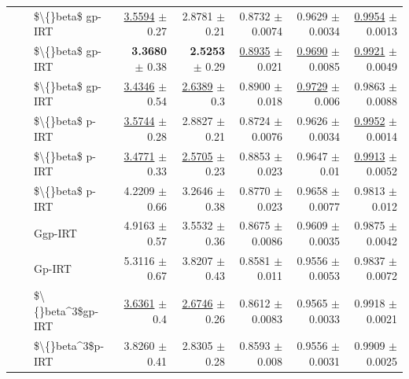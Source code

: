 \begin{longtable}{llp{}rrrrr}
 &  & \$\textbackslash\{\}beta\$ gp-IRT & \underline{3.5594} {\scriptsize $\pm$ 0.27} & 2.8781 {\scriptsize $\pm$ 0.21} & 0.8732 {\scriptsize $\pm$ 0.0074} & 0.9629 {\scriptsize $\pm$ 0.0034} & \underline{0.9954} {\scriptsize $\pm$ 0.0013} \\
 &  & \$\textbackslash\{\}beta\$ gp-IRT & \textbf{3.3680} {\scriptsize $\pm$ 0.38} & \textbf{2.5253} {\scriptsize $\pm$ 0.29} & \underline{0.8935} {\scriptsize $\pm$ 0.021} & \underline{0.9690} {\scriptsize $\pm$ 0.0085} & \underline{0.9921} {\scriptsize $\pm$ 0.0049} \\
 &  & \$\textbackslash\{\}beta\$ gp-IRT & \underline{3.4346} {\scriptsize $\pm$ 0.54} & \underline{2.6389} {\scriptsize $\pm$ 0.3} & 0.8900 {\scriptsize $\pm$ 0.018} & \underline{0.9729} {\scriptsize $\pm$ 0.006} & 0.9863 {\scriptsize $\pm$ 0.0088} \\
 &  & \$\textbackslash\{\}beta\$ p-IRT & \underline{3.5744} {\scriptsize $\pm$ 0.28} & 2.8827 {\scriptsize $\pm$ 0.21} & 0.8724 {\scriptsize $\pm$ 0.0076} & 0.9626 {\scriptsize $\pm$ 0.0034} & \underline{0.9952} {\scriptsize $\pm$ 0.0014} \\
 &  & \$\textbackslash\{\}beta\$ p-IRT & \underline{3.4771} {\scriptsize $\pm$ 0.33} & \underline{2.5705} {\scriptsize $\pm$ 0.23} & 0.8853 {\scriptsize $\pm$ 0.023} & 0.9647 {\scriptsize $\pm$ 0.01} & \underline{0.9913} {\scriptsize $\pm$ 0.0052} \\
 &  & \$\textbackslash\{\}beta\$ p-IRT & 4.2209 {\scriptsize $\pm$ 0.66} & 3.2646 {\scriptsize $\pm$ 0.38} & 0.8770 {\scriptsize $\pm$ 0.023} & 0.9658 {\scriptsize $\pm$ 0.0077} & 0.9813 {\scriptsize $\pm$ 0.012} \\
 &  & Ggp-IRT & 4.9163 {\scriptsize $\pm$ 0.57} & 3.5532 {\scriptsize $\pm$ 0.36} & 0.8675 {\scriptsize $\pm$ 0.0086} & 0.9609 {\scriptsize $\pm$ 0.0035} & 0.9875 {\scriptsize $\pm$ 0.0042} \\
 &  & Gp-IRT & 5.3116 {\scriptsize $\pm$ 0.67} & 3.8207 {\scriptsize $\pm$ 0.43} & 0.8581 {\scriptsize $\pm$ 0.011} & 0.9556 {\scriptsize $\pm$ 0.0053} & 0.9837 {\scriptsize $\pm$ 0.0072} \\
 &  & \$\textbackslash\{\}beta\textasciicircum{}3\$gp-IRT & \underline{3.6361} {\scriptsize $\pm$ 0.4} & \underline{2.6746} {\scriptsize $\pm$ 0.26} & 0.8612 {\scriptsize $\pm$ 0.0083} & 0.9565 {\scriptsize $\pm$ 0.0033} & 0.9918 {\scriptsize $\pm$ 0.0021} \\
 &  & \$\textbackslash\{\}beta\textasciicircum{}3\$p-IRT & 3.8260 {\scriptsize $\pm$ 0.41} & 2.8305 {\scriptsize $\pm$ 0.28} & 0.8593 {\scriptsize $\pm$ 0.008} & 0.9556 {\scriptsize $\pm$ 0.0031} & 0.9909 {\scriptsize $\pm$ 0.0025} \\

\end{longtable}
